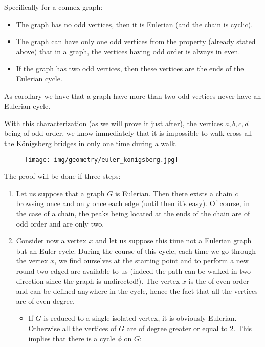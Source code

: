 {\begin{enumerate}
\begin{theorem}
	Specifically for a connex graph:
	\begin{itemize}
		\item The graph has no odd vertices, then it is Eulerian (and the chain is cyclic).
		
		\item The graph can have only one odd vertices from the property (already stated above) that in a graph, the vertices having odd order is always in even.
		
		\item If the graph has two odd vertices, then these vertices are the ends of the Eulerian cycle.
	\end{itemize}
	As corollary we have that a graph have more than two odd vertices never have an Eulerian cycle.
	\end{theorem}
	With this characterization (as we will prove it just after), the vertices $a,b,c,d$ being of odd order, we know immediately that it is impossible to walk cross all the Königsberg bridges in only one time during a walk.
	\begin{figure}[H]
		\centering
		\texttt{[image: img/geometry/euler\_konigsberg.jpg]}
	\end{figure}
	
	\pagebreak
	\begin{dem}
	The proof will be done if three steps:
	\begin{enumerate}
		\item Let us suppose that a graph $G$ is Eulerian. Then there exists a chain $c$ browsing once and only once each edge (until then it's easy). Of course, in the case of a chain, the peaks being located at the ends of the chain are of odd order and are only two.
		
		\item Consider now a vertex $x$ and let us suppose this time not a Eulerian graph but an Euler cycle. During the course of this cycle, each time we go through the vertex $x$, we find ourselves at the starting point and to perform a new round two edged are available to us (indeed the path can be walked in two direction since the graph is undirected!). The vertex $x$ is the of even order and can be defined anywhere in the cycle, hence the fact that all the vertices are of even degree.
		
		\begin{itemize}
			\item If $G$ is reduced to a single isolated vertex, it is obviously Eulerian. Otherwise all the vertices of $G$ are of degree greater or equal to $2$. This implies that there is a cycle $\phi$ on $G$:
			

\end{itemize}
\end{enumerate}
\end{dem}
\end{enumerate}}
